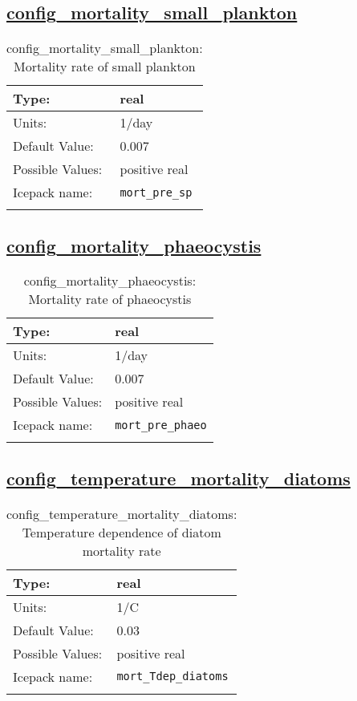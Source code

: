 \subsection[config\_mortality\_small\_plankton]{\hyperref[sec:nm_tab_biogeochemistry]{config\_mortality\_small\_plankton}}
\label{subsec:nm_sec_config_mortality_small_plankton}
\begin{center}
\begin{longtable}{| p{2.0in} || p{4.0in} |}
    \hline
    Type: & real \\
    \hline
    Units: & \si{1/day} \\
    \hline
    Default Value: & 0.007 \\
    \hline
    Possible Values: & positive real \\
    \hline
    \hline
    Icepack name: & \verb+mort_pre_sp+ \\
    \caption{config\_mortality\_small\_plankton: Mortality rate of small plankton}
\end{longtable}
\end{center}
\subsection[config\_mortality\_phaeocystis]{\hyperref[sec:nm_tab_biogeochemistry]{config\_mortality\_phaeocystis}}
\label{subsec:nm_sec_config_mortality_phaeocystis}
\begin{center}
\begin{longtable}{| p{2.0in} || p{4.0in} |}
    \hline
    Type: & real \\
    \hline
    Units: & \si{1/day} \\
    \hline
    Default Value: & 0.007 \\
    \hline
    Possible Values: & positive real \\
    \hline
    \hline
    Icepack name: & \verb+mort_pre_phaeo+ \\
    \caption{config\_mortality\_phaeocystis: Mortality rate of phaeocystis}
\end{longtable}
\end{center}
\subsection[config\_temperature\_mortality\_diatoms]{\hyperref[sec:nm_tab_biogeochemistry]{config\_temperature\_mortality\_diatoms}}
\label{subsec:nm_sec_config_temperature_mortality_diatoms}
\begin{center}
\begin{longtable}{| p{2.0in} || p{4.0in} |}
    \hline
    Type: & real \\
    \hline
    Units: & \si{1/C} \\
    \hline
    Default Value: & 0.03 \\
    \hline
    Possible Values: & positive real \\
    \hline
    \hline
    Icepack name: & \verb+mort_Tdep_diatoms+ \\
    \caption{config\_temperature\_mortality\_diatoms: Temperature dependence of diatom mortality rate}
\end{longtable}
\end{center}
